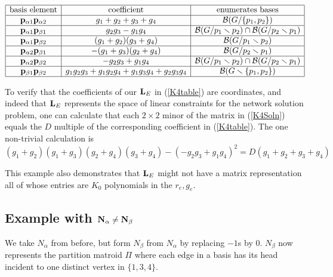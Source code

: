 \begin{equation}\label{K4table}
\begin{array}{|c|c|c|} \hline
\text{basis element} & \text{coefficient} & \text{enumerates bases}\\
  \hline

\mathbf{p}_{\alpha 1}\mathbf{p}_{\alpha 2} &
g_1 + g_2 + g_3 + g_4 & \mathcal{B}(G/\{p_1, p_2\})

\\ \hline

\mathbf{p}_{\alpha 1}\mathbf{p}_{\beta 1} &
g_2g_3 - g_1g_4 &  \mathcal{B}(G/p_1\smallsetminus p_2)\cap\mathcal{B}(G/p_2\smallsetminus p_1)

\\ \hline

\mathbf{p}_{\alpha 1}\mathbf{p}_{\beta 2} &
(g_1 + g_2)(g_3 + g_4) & \mathcal{B}(G/p_1\smallsetminus p_2)
\\ \hline 

\mathbf{p}_{\alpha 2}\mathbf{p}_{\beta 1} & -(g_1 + g_3)(g_2+g_4) & \mathcal{B}(G/p_2\smallsetminus p_1)
\\ \hline
 
\mathbf{p}_{\alpha 2}\mathbf{p}_{\beta 2} &
-g_2g_3 + g_1g_4 & \mathcal{B}(G/p_1\smallsetminus p_2)\cap\mathcal{B}(G/p_2\smallsetminus p_1)
\\ \hline
 
\mathbf{p}_{\beta 1}\mathbf{p}_{\beta 2} &
g_1g_2g_3 + g_1g_2g_4 + g_1g_3g_4 + g_2g_3g_4 & \mathcal{B}(G\smallsetminus \{p_1, p_2\})
\\ \hline

\end{array}
\end{equation}

To verify that the coefficients of our $\mathbf{L}_E$
in (\ref{K4table}) are \Plucker coordinates, and
indeed that $\mathbf{L}_E$ represents the space of
linear constraints for the
network solution problem,
one can calculate that each $2\times 2$ minor of the matrix in
(\ref{K4Soln}) equals the $D$ multiple of the corresponding coefficient
in  (\ref{K4table}).  The one non-trivial calculation is
\[
{\left(g_{1} + g_{2}\right)} {\left(g_{1} + g_{3}\right)} {\left(g_{2} + g_{4}\right)} {\left(g_{3} + g_{4}\right)} - {\left(-g_{2} g_{3} + g_{1} g_{4}\right)}^{2} = D(g_1+g_2+g_3+g_4)
\]

This example also demonstrates that $\mathbf{L}_E$ might not have a
matrix representation all of whose entries are $K_0$ polynomials in the $r_e, g_e$.

\subsection{Example with $\mathbf{N}_\alpha\neq\mathbf{N}_\beta$}
We take $N_\alpha$ from before, but form $N_\beta$ from $N_\alpha$ by replacing $-1$s by $0$.
$N_\beta$ now represents the partition matroid $\Pi$ where
each edge in a basis has its head incident to one distinct vertex in $\{1, 3, 4 \}$.


